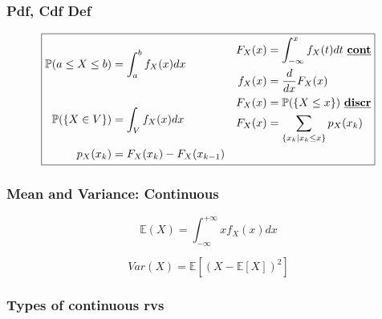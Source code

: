\documentclass[10pt]{article}
\begin{document}
\begin{multicols}{2}
\subsubsection*{Pdf, Cdf Def}

\begin{equation*}
  \boxed{
    \begin{aligned}
      \mathbb{P}(a\leq X\leq b) &= \int_a^b f_X(x)dx  &&
      \begin{aligned}
        F_X(x) &= \int_{-\infty}^x f_X(t)dt \text{ \underline{\textbf{cont}}} \\
        f_X(x) &= \frac{d}{dx} F_X(x)
      \end{aligned} \\
      \mathbb{P}(\{X\in V\}) &= \int_V f_X(x)dx &&
      \begin{aligned}
        F_X(x) &= \mathbb{P}(\{X\leq x\}) \text{ \underline{\textbf{discr}}} \\
        F_X(x) &= \sum_{\{x_k \mid x_k \leq x\}} p_X(x_k)
      \end{aligned} \\
      p_X(x_k) &= F_X(x_k) - F_X(x_{k-1})
    \end{aligned}
  }
\end{equation*}


\columnbreak
\subsubsection*{\qquad Mean and Variance: Continuous}
\begin{equation*}
  \boxed{
    \mathbb{E}(X) = \int_{-\infty}^{+\infty} xf_X(x)dx
  }
\end{equation*}

\begin{equation*}
  \boxed{
    Var(X) = \mathbb{E}[(X - \mathbb{E}[X])^2]
  }
\end{equation*}
\end{multicols}

\subsubsection*{Types of continuous rvs}
\end{document}
